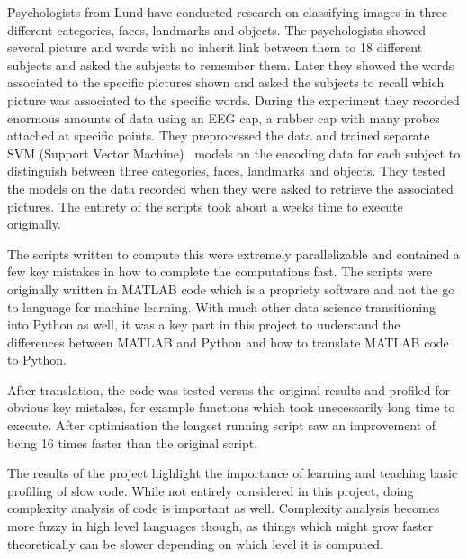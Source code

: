 \documentclass[12pt, a4paper]{article}
\begin{document}
Psychologists from Lund have conducted research on classifying images in three different categories, faces, landmarks and objects.
The psychologists showed several picture and words with no inherit link between them to 18 different subjects and asked the subjects to remember them.
Later they showed the words associated to the specific pictures shown and asked the subjects to recall which picture was associated to the specific words.
During the experiment they recorded enormous amounts of data using an EEG cap, a rubber cap with many probes attached at specific points.
They preprocessed the data and trained separate SVM (Support Vector Machine)~\cite{wiki:SVM} models on the encoding data for each subject to distinguish between three categories, faces, landmarks and objects.
They tested the models on the data recorded when they were asked to retrieve the associated pictures.
The entirety of the scripts took about a weeks time to execute originally.\par 

The scripts written to compute this were extremely parallelizable and contained a few key mistakes in how to complete the computations fast.
The scripts were originally written in MATLAB code which is a propriety software and not the go to language for machine learning.
With much other data science transitioning into Python as well, it was a key part in this project to understand the differences between MATLAB and Python and how to translate MATLAB code to Python.\par

After translation, the code was tested versus the original results and profiled for obvious key mistakes, for example functions which took unecessarily long time to execute.
After optimisation the longest running script saw an improvement of being 16 times faster than the original script.

The results of the project highlight the importance of learning and teaching basic profiling of slow code.
While not entirely considered in this project, doing complexity analysis of code is important as well.
Complexity analysis becomes more fuzzy in high level languages though, as things which might grow faster theoretically can be slower depending on which level it is computed.


\newpage


\tableofcontents

\clearpage
\end{document}
